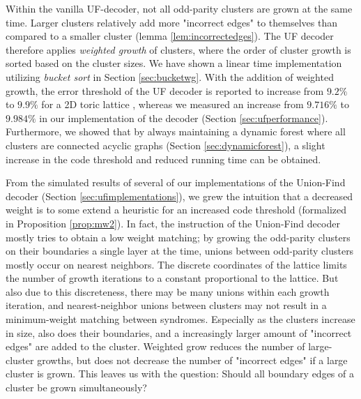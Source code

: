 Within the vanilla UF-decoder, not all odd-parity clusters are grown at the same time. Larger clusters relatively add more "incorrect edges" to themselves than compared to a smaller cluster (lemma \ref{lem:incorrectedges}). The UF decoder therefore applies \emph{weighted growth} of clusters, where the order of cluster growth is sorted based on the cluster sizes. We have shown a linear time implementation utilizing \emph{bucket sort} in Section \ref{sec:bucketwg}. With the addition of weighted growth, the error threshold of the UF decoder is reported to increase from $9.2\%$ to $9.9\%$ for a 2D toric lattice \cite{delfosse2017almost}, whereas we measured an increase from $9.716\%$ to $9.984\%$ in our implementation of the decoder (Section \ref{sec:ufperformance}). Furthermore, we showed that by always maintaining a dynamic forest where all clusters are connected acyclic graphs (Section \ref{sec:dynamicforest}), a slight increase in the code threshold and reduced running time can be obtained. 

From the simulated results of several of our implementations of the Union-Find decoder (Section \ref{sec:ufimplementations}), we grew the intuition that a decreased weight is to some extend a heuristic for an increased code threshold (formalized in Proposition \ref{prop:mw2}). In fact, the instruction of the Union-Find decoder mostly tries to obtain a low weight matching; by growing the odd-parity clusters on their boundaries a single layer at the time, unions between odd-parity clusters mostly occur on nearest neighbors. The discrete coordinates of the lattice limits the number of growth iterations to a constant proportional to the lattice. But also due to this discreteness, there may be many unions within each growth iteration, and nearest-neighbor unions between clusters may not result in a minimum-weight matching between syndromes. Especially as the clusters increase in size, also does their boundaries, and a increasingly larger amount of "incorrect edges" are added to the cluster. Weighted grow reduces the number of large-cluster growths, but does not decrease the number of "incorrect edges" if a large cluster is grown. This leaves us with the question: Should all boundary edges of a cluster be grown simultaneously?

